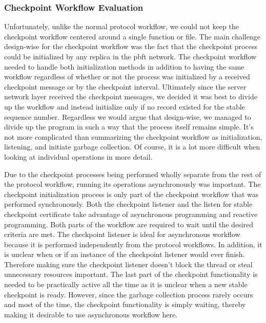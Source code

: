 \subsubsection{Checkpoint Workflow Evaluation}
\label{sec:checkpointEval}
Unfortunately, unlike the normal protocol workflow, we could not keep the checkpoint workflow centered around a single function or file. 
The main challenge design-wise for the checkpoint workflow was the fact that the checkpoint process could be initialized by any replica in the \ac{pbft} network. The checkpoint workflow needed to handle both initialization methods in addition to having the same workflow regardless of whether or not the process was initialized by a received checkpoint message or by the checkpoint interval. Ultimately since the server network layer received the checkpoint messages, we decided it was best to divide up the workflow and instead initialize only if no record existed for the stable sequence number. Regardless we would argue that design-wise, we managed to divide up the program in such a way that the process itself remains simple. It's not more complicated than summarizing the checkpoint workflow as initialization, listening, and initiate garbage collection. Of course, it is a lot more difficult when looking at individual operations in more detail. 

Due to the checkpoint processes being performed wholly separate from the rest of the protocol workflow, running its operations asynchronously was important. The checkpoint initialization process is only part of the checkpoint workflow that was performed synchronously. Both the checkpoint listener and the listen for stable checkpoint certificate take advantage of asynchronous programming and reactive programming. Both parts of the workflow are required to wait until the desired criteria are met. The checkpoint listener is ideal for asynchronous workflow because it is performed independently from the protocol workflows. In addition, it is unclear when or if an instance of the checkpoint listener would ever finish. Therefore making sure the checkpoint listener doesn't block the thread or steal unnecessary resources important.
The last part of the checkpoint functionality is needed to be practically active all the time as it is unclear when a new stable checkpoint is ready. However, since the garbage collection process rarely occurs and most of the time, the checkpoint functionality is simply waiting, thereby making it desirable to use asynchronous workflow here.

